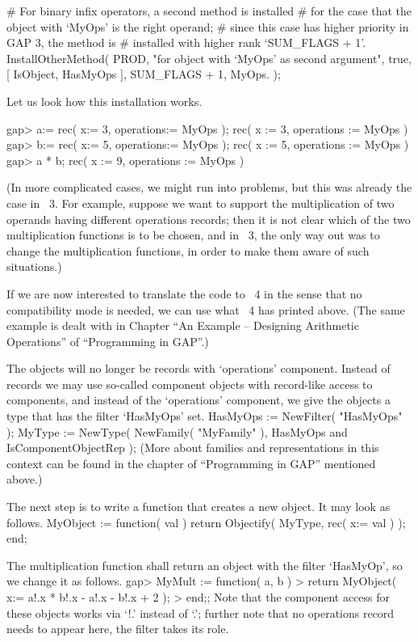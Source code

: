 # For binary infix operators, a second method is installed
# for the case that the object with `MyOps' is the right operand;
# since this case has higher priority in GAP 3, the method is
# installed with higher rank `SUM_FLAGS + 1'.
InstallOtherMethod( PROD,
    "for object with `MyOps' as second argument",
    true,
    [ IsObject, HasMyOps ], SUM_FLAGS + 1,
    MyOps.\* );
\endtt

Let us look how this installation works.

\begintt
gap> a:= rec( x:= 3, operations:= MyOps );
rec( x := 3, operations := MyOps )
gap> b:= rec( x:= 5, operations:= MyOps );
rec( x := 5, operations := MyOps )
gap> a * b;
rec( x := 9, operations := MyOps )
\endtt

(In more complicated cases, we might run into problems, but this was
already the case in {\GAP}~3.  For example, suppose we want to support
the multiplication of two operands having different operations
records; then it is not clear which of the two multiplication
functions is to be chosen, and in {\GAP}~3, the only way out was to
change the multiplication functions, in order to make them aware of
such situations.)

If we are now interested to translate the code to {\GAP}~4 in the
sense that no compatibility mode is needed, we can use what {\GAP}~4
has printed above.  (The same example is dealt with in Chapter ``An
Example -- Designing Arithmetic Operations'' of ``Programming in
GAP''.)

The objects will no longer be records with `operations' component.
Instead of records we may use so-called component objects
with record-like access to components, 
and instead of the `operations' component, we give the objects a
type that has the filter `HasMyOps' set.
\begintt
HasMyOps := NewFilter( "HasMyOps" );
MyType := NewType( NewFamily( "MyFamily" ),
                   HasMyOps and IsComponentObjectRep );
\endtt
(More about families and representations in this context can be found
in the chapter of ``Programming in GAP'' mentioned above.)

The next step is to write a function that creates a new object.
It may look as follows.
\begintt
MyObject := function( val )
    return Objectify( MyType, rec( x:= val ) );
end;
\endtt

The multiplication function shall return an object with the
filter `HasMyOp', so we change it as follows.
\begintt
gap> MyMult := function( a, b )                          
>        return MyObject( x:= a!.x * b!.x - a!.x - b!.x + 2 );
>    end;; 
\endtt
Note that the component access for these objects
works via `!.' instead of `.';
further note that no operations record needs to appear here,
the filter takes its role.

